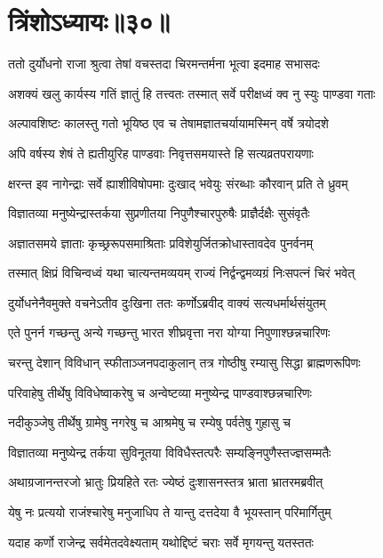 \chapter{त्रिंशोऽध्यायः॥३०॥}

\twolineshloka
{ततो दुर्योधनो राजा श्रुत्वा तेषां वचस्तदा}
{चिरमन्तर्मना भूत्वा इदमाह सभासदः}


\twolineshloka
{अशक्यं खलु कार्यस्य गतिं ज्ञातुं हि तत्त्वतः}
{तस्मात् सर्वे परीक्षध्वं क्व नु स्युः पाण्डवा गताः}


\twolineshloka
{अल्पावशिष्टः कालस्तु गतो भूयिष्ठ एव च}
{तेषामज्ञातचर्यायामस्मिन् वर्षे त्रयोदशे}


\twolineshloka
{अपि वर्षस्य शेषं ते ह्यतीयुरिह पाण्डवाः}
{निवृत्तसमयास्ते हि सत्यव्रतपरायणाः}


\twolineshloka
{क्षरन्त इव नागेन्द्राः सर्वे ह्याशीविषोपमाः}
{दुःखाद् भवेयुः संरब्धाः कौरवान् प्रति ते ध्रुवम्}


\twolineshloka
{विज्ञातव्या मनुष्येन्द्रास्तर्कया सुप्रणीतया}
{निपुणैश्चारपुरुषैः प्राज्ञैर्दक्षैः सुसंवृतैः}


\twolineshloka
{अज्ञातसमये ज्ञाताः कृच्छ्ररूपसमाश्रिताः}
{प्रविशेयुर्जितक्रोधास्तावदेव पुनर्वनम्}


\twolineshloka
{तस्मात् क्षिप्रं विचिन्वध्वं यथा चात्यन्तमव्ययम्}
{राज्यं निर्द्वन्द्वमव्यग्रं निःसपत्नं चिरं भवेत्}


\twolineshloka
{दुर्योधनेनैवमुक्ते वचनेऽतीव दुःखिना}
{ततः कर्णोऽब्रवीद् वाक्यं सत्यधर्मार्थसंयुतम्}


\twolineshloka
{एते पुनर्न गच्छन्तु अन्ये गच्छन्तु भारत}
{शीघ्रवृत्ता नरा योग्या निपुणाश्छन्नचारिणः}


\twolineshloka
{चरन्तु देशान् विविधान् स्फीताञ्जनपदाकुलान्}
{तत्र गोष्ठीषु रम्यासु सिद्धा ब्राह्मणरूपिणः}


\twolineshloka
{परिवाहेषु तीर्थेषु विविधेष्वाकरेषु च}
{अन्वेष्टव्या मनुष्येन्द्र पाण्डवाश्छन्नचारिणः}


\twolineshloka
{नदीकुञ्जेषु तीर्थेषु ग्रामेषु नगरेषु च}
{आश्रमेषु च रम्येषु पर्वतेषु गुहासु च}


\twolineshloka
{विज्ञातव्या मनुष्येन्द्र तर्कया सुविनूतया}
{विविधैस्तत्परैः सम्यङ्निपुणैस्तज्ज्ञसम्मतैः}


\twolineshloka
{अथाग्रजानन्तरजो भ्रातुः प्रियहिते रतः}
{ज्येष्ठं दुःशासनस्तत्र भ्राता भ्रातरमब्रवीत्}


\twolineshloka
{येषु नः प्रत्ययो राजंश्चारेषु मनुजाधिप}
{ते यान्तु दत्तदेया वै भूयस्तान् परिमार्गितुम्}


\twolineshloka
{यदाह कर्णो राजेन्द्र सर्वमेतदवेक्ष्यताम्}
{यथोद्दिष्टं चराः सर्वे मृगयन्तु यतस्ततः}



